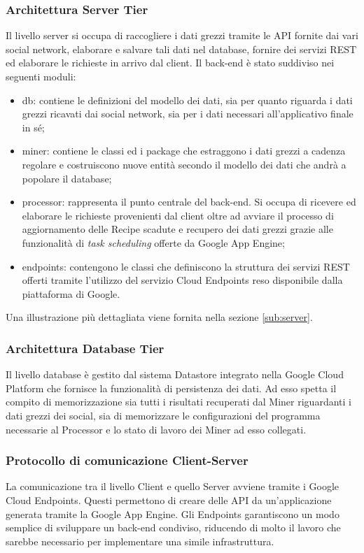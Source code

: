 		\subsubsection{Architettura Server Tier}
		Il livello server si occupa di raccogliere i dati grezzi tramite le API fornite dai vari social network, elaborare e salvare tali dati nel database, fornire dei servizi REST ed elaborare le richieste in arrivo dal client. Il back-end è stato suddiviso nei seguenti moduli:
		\begin{itemize}
		  \item db: contiene le definizioni del modello dei dati, sia per quanto riguarda i dati grezzi ricavati dai social network, sia per i dati necessari all'applicativo finale in sé;
			\item miner: contiene le classi ed i package che estraggono i dati grezzi a cadenza regolare e costruiscono nuove entità secondo il modello dei dati che andrà a popolare il database;
			\item processor: rappresenta il punto centrale del back-end. Si occupa di ricevere ed elaborare le richieste provenienti dal client oltre ad avviare il processo di aggiornamento delle Recipe scadute e recupero dei dati grezzi grazie alle funzionalità di \textit{task scheduling} offerte da Google App Engine;
			\item endpoints: contengono le classi che definiscono la struttura dei servizi REST offerti tramite l'utilizzo del servizio Cloud Endpoints reso disponibile dalla piattaforma di Google.
		\end{itemize}
		Una illustrazione più dettagliata viene fornita nella sezione \ref{sub:server}.

		\subsubsection{Architettura Database Tier}
		Il livello database è gestito dal sistema Datastore integrato nella Google Cloud Platform che fornisce la funzionalità di persistenza dei dati. Ad esso spetta il compito di memorizzazione sia tutti i risultati recuperati dal Miner riguardanti i dati grezzi dei social, sia di memorizzare le configurazioni del programma necessarie al Processor e lo stato di lavoro dei Miner ad esso collegati.

		\subsubsection{Protocollo di comunicazione Client-Server}
		La comunicazione tra il livello Client e quello Server avviene tramite i Google Cloud Endpoints. Questi permettono di creare delle API da un'applicazione generata tramite la Google App Engine. Gli Endpoints garantiscono un modo semplice di sviluppare un back-end condiviso, riducendo di molto il lavoro che sarebbe necessario per implementare una simile infrastruttura.


